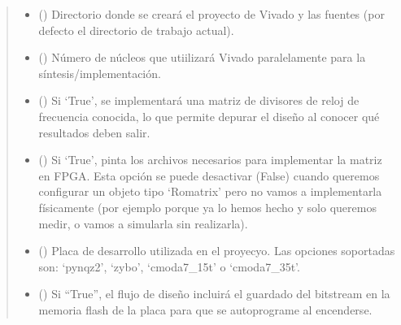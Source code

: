 \documentclass[letterpaper,10pt,english]{sphinxmanual}
\begin{document}
\begin{fulllineitems}
\begin{fulllineitems}
\begin{quote}
\begin{description}
\begin{itemize}
\item {} 
\sphinxAtStartPar
{} (\sphinxstyleliteralemphasis{\sphinxupquote{, }}) \textendash{} Directorio donde se creará el proyecto de Vivado y las fuentes (por defecto el directorio de trabajo actual).

\item {} 
\sphinxAtStartPar
{} (\sphinxstyleliteralemphasis{\sphinxupquote{, }}) \textendash{} Número de núcleos que utiilizará Vivado paralelamente para la síntesis/implementación.

\item {} 
\sphinxAtStartPar
{} (\sphinxstyleliteralemphasis{\sphinxupquote{, }}) \textendash{} Si ‘True’, se implementará una matriz de divisores de reloj de frecuencia conocida, lo que permite depurar el diseño al conocer qué resultados deben salir.

\item {} 
\sphinxAtStartPar
{} (\sphinxstyleliteralemphasis{\sphinxupquote{, }}) \textendash{} Si ‘True’, pinta los archivos necesarios para implementar la matriz en FPGA. Esta opción se puede desactivar (False) cuando queremos configurar un objeto tipo ‘Romatrix’ pero no vamos a implementarla físicamente (por ejemplo porque ya lo hemos hecho y solo queremos medir, o vamos a simularla sin realizarla).

\item {} 
\sphinxAtStartPar
{} (\sphinxstyleliteralemphasis{\sphinxupquote{, }}) \textendash{} Placa de desarrollo utilizada en el proyecyo. Las opciones soportadas son: ‘pynqz2’, ‘zybo’, ‘cmoda7\_15t’ o ‘cmoda7\_35t’.

\item {} 
\sphinxAtStartPar
{} (\sphinxstyleliteralemphasis{\sphinxupquote{, }}) \textendash{} Si “True”, el flujo de diseño incluirá el guardado del bitstream en la memoria flash de la placa para que se auto\sphinxhyphen{}programe al encenderse.


\end{itemize}
\end{description}
\end{quote}
\end{fulllineitems}
\end{fulllineitems}
\end{document}
